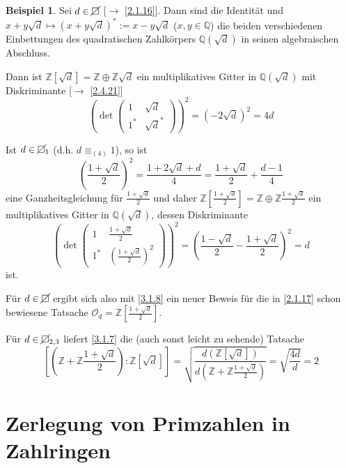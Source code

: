 \documentclass[
twoside=semi,
fontsize=12,
DIV=12, 
cleardoublepage=current,
leqno,
headings=optiontoheadandtoc, 
toc=idx
]{scrbook}
\newcommand{\Z}{\mathbb{Z}}
\newcommand{\Q}{\mathbb{Q}}
\newcommand{\nsquare}{\cancel{\square}}
\newcommand{\brac}[1]{\left( #1 \right)}
\theoremstyle{definition}
\newtheorem{beispiel}[definition]{Beispiel}
\begin{document}
	\begin{beispiel}\label{3.1.9}
		Sei $d \in \nsquare$ [$\to$ \ref{2.1.16}]. Dann sind die Identit\"at und $x+y\sqrt{d} \mapsto (x+y\sqrt{d})^* := x- y \sqrt{d}$ ($x,y \in \Q$) die beiden verschiedenen
		Einbettungen des quadratischen Zahlk\"orpers $\Q(\sqrt{d})$ in seinen algebraischen Abschluss.
		
		Dann ist $\Z[\sqrt{d}] = \Z \oplus \Z\sqrt{d}$ ein multiplikatives Gitter in $\Q(\sqrt{d})$ mit Diskriminante [$\to$ \ref{2.4.21}]
		\[\brac{\det \begin{pmatrix}
				1 & \sqrt{d}\\1^* & \sqrt{d}^*
		\end{pmatrix}}^2 = (-2\sqrt{d})^2 = 4d\]
	
		Ist $d \in \nsquare_1$ (d.h. $d \equiv_{(4)} 1$), so ist 	
			\[\brac{\frac{1+\sqrt{d}}{2}}^2 = \frac{1+2\sqrt{d} + d}{4} = \frac{1+\sqrt{d}}{2} + \frac{d-1}{4}\]
		eine Ganzheitsgleichung f\"ur $\frac{1+\sqrt{d}}{2}$ und daher $\Z[\frac{1+\sqrt{d}}{2}] = \Z \oplus \Z\frac{1+\sqrt{d}}{2}$
		ein multiplikatives Gitter in $\Q(\sqrt{d})$, dessen Diskriminante 
		\[\brac{\det \begin{pmatrix}
				1 & \frac{1+\sqrt{d}}{2} \\ 1^* & \brac{\frac{1+\sqrt{d}}{2}}^2
		\end{pmatrix}}^2 = \brac{\frac{1-\sqrt{d}}{2} - \frac{1+\sqrt{d}  }{2}  }^2 = d\]
		ist.
		
		F\"ur $d \in \nsquare$ ergibt sich also mit \ref{3.1.8} ein neuer Beweis f\"ur die in \ref{2.1.17} schon bewiesene Tatsache
		$\mathcal{O}_d = \Z[\frac{1+\sqrt{d}}{2}]$.
		
		F\"ur $d \in \nsquare_{2,3}$ liefert \ref{3.1.7} die (auch sonst leicht zu sehende) Tatsache 
		\[[(\Z+\Z\frac{1+\sqrt{d}}{2}): \Z[\sqrt{d}]] = \sqrt{\frac{d(\Z[\sqrt{d}])}{d(\Z + \Z\frac{1+\sqrt{d}}{2})}} = \sqrt{\frac{4d}{d}} = 2\]
	\end{beispiel}
	\newpage
	
	\section{Zerlegung von Primzahlen in Zahlringen}\thispagestyle{sectionstart}
	
\end{document}
